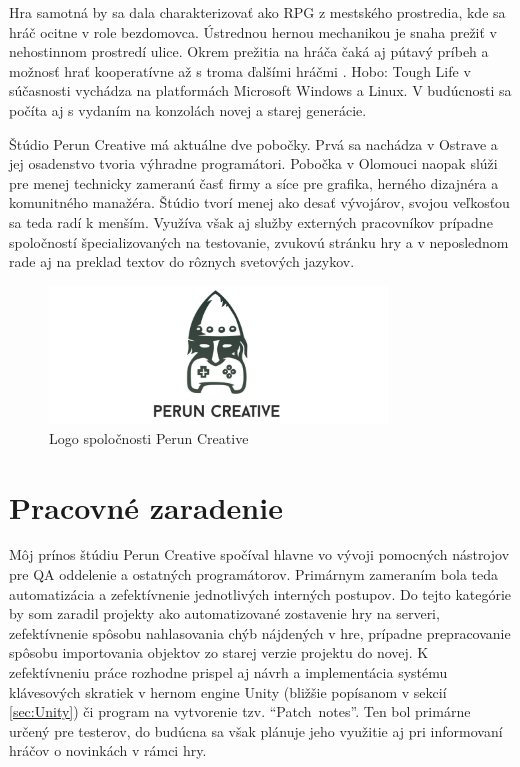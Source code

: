 \documentclass[slovak, bachelorpractice]{diploma}
\begin{document}
Hra samotná by sa dala charakterizovať ako RPG z mestského prostredia, kde sa hráč ocitne v role bezdomovca. Ústrednou hernou mechanikou je snaha prežiť v nehostinnom prostredí ulice. Okrem prežitia na hráča čaká aj pútavý príbeh a možnosť hrať kooperatívne až s troma ďalšími hráčmi \cite{Hobo}. Hobo: Tough Life v súčasnosti vychádza na platformách Microsoft Windows a Linux. V budúcnosti sa počíta aj s vydaním na konzolách novej a starej generácie. 

Štúdio Perun Creative má aktuálne dve pobočky. Prvá sa nachádza v Ostrave a jej osadenstvo tvoria výhradne programátori. Pobočka v Olomouci naopak slúži pre menej technicky zameranú časť firmy a síce pre grafika, herného dizajnéra a komunitného manažéra. Štúdio tvorí menej ako desať vývojárov, svojou veľkosťou sa teda radí k menším. Využíva však aj služby externých pracovníkov prípadne spoločností špecializovaných na testovanie, zvukovú stránku hry a v neposlednom rade aj na preklad textov do rôznych svetových jazykov.
\vspace{-5pt}
\begin{figure}[!htbp]
	\centering
	\includegraphics[width=0.8\textwidth]{Pictures/logoNew.jpg}
	\vspace{-5pt}
	\caption{Logo spoločnosti Perun Creative}
	\label{pic:perunLogo}
\end{figure}
\section{Pracovné zaradenie}
\label{sec:Me}
Môj prínos štúdiu Perun Creative spočíval hlavne vo vývoji pomocných nástrojov pre QA oddelenie a ostatných programátorov. Primárnym zameraním bola teda automatizácia a zefektívnenie jednotlivých interných postupov. Do tejto kategórie by som zaradil projekty ako automatizované zostavenie hry na serveri, zefektívnenie spôsobu nahlasovania chýb nájdených v hre, prípadne prepracovanie spôsobu importovania objektov zo starej verzie projektu do novej. K zefektívneniu práce rozhodne prispel aj návrh a implementácia systému klávesových skratiek v hernom engine Unity (bližšie popísanom v sekcií \ref{sec:Unity}) či  program na vytvorenie tzv. \mbox{\enquote{Patch notes}}. Ten bol primárne určený pre testerov, do budúcna sa však plánuje jeho využitie aj pri informovaní hráčov o novinkách v rámci hry.
\end{document}
